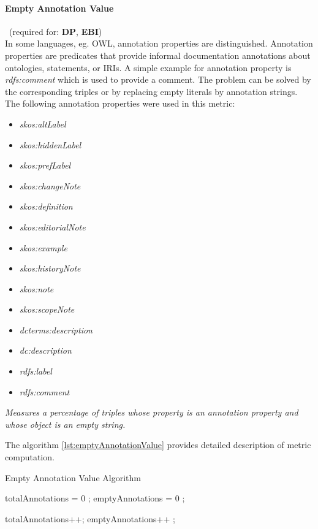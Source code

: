 \paragraph{Empty Annotation Value}~(required for: \textbf{DP}, \textbf{EBI})~\\
In some languages, eg. OWL, annotation properties are distinguished.
Annotation properties are predicates that provide informal documentation annotations about ontologies, statements, or IRIs. 
A simple example for annotation property is \textit{rdfs:comment} which is used to provide a comment. 
The problem can be solved by the corresponding triples or by replacing empty literals by annotation strings.
The following annotation properties were used in this metric:
\begin{itemize}
\item \textit{skos:altLabel}
\item \textit{skos:hiddenLabel}
\item \textit{skos:prefLabel}
\item \textit{skos:changeNote}
\item \textit{skos:definition}
\item \textit{skos:editorialNote}
\item \textit{skos:example}
\item \textit{skos:historyNote}
\item \textit{skos:note}
\item \textit{skos:scopeNote}
\item \textit{dcterms:description}
\item \textit{dc:description}
\item \textit{rdfs:label}
\item \textit{rdfs:comment}
\end{itemize}

\begin{mdframed}[style=metricdefinition]
\emph{Measures a percentage of triples whose property is an annotation property and whose object is an empty string.}

\end{mdframed}

The algorithm \ref{lst:emptyAnnotationValue} provides detailed description of metric computation. 
\begin{algorithm}
\caption{Empty Annotation Value Algorithm}\label{lst:emptyAnnotationValue}
\begin{algorithmic}[1]
\State totalAnnotations = 0 ;
\State emptyAnnotations = 0 ;
\EndProcedure

 totalAnnotations++; \EndIf
{} emptyAnnotations++ ; \EndIf
\EndProcedure
\end{algorithmic}
\end{algorithm}


